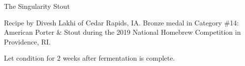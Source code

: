 \begin{recipe}{The Singularity Stout}

\begin{aboutblock}
Recipe by Divesh Lakhi of Cedar Rapids, IA. Bronze medal in Category \#14:
American Porter \& Stout during the 2019 National Homebrew Competition
in Providence, RI. \sourceaha
\end{aboutblock}


\begin{methodandtiming}
 
\begin{mashsteps}
\end{mashsteps}

\begin{fermentationsteps}
\end{fermentationsteps}

\begin{directions}
Let condition for 2 weeks after fermentation is complete.
\end{directions}

\end{methodandtiming}

\recipebreak

\begin{ingredientsblock}

\begin{malts}
\end{malts}

\begin{hops}
\end{hops}


\end{ingredientsblock}

\end{recipe}
